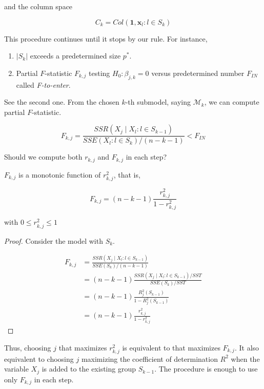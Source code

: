\documentclass[]{book}
\providecommand{\tightlist}{%
  \setlength{\itemsep}{0pt}\setlength{\parskip}{0pt}}
\theoremstyle{definition}
\theoremstyle{definition}
\theoremstyle{definition}
\theoremstyle{remark}
\let\BeginKnitrBlock\begin \let\EndKnitrBlock\end
\begin{document}
and the column space

\[C_k = Col(\mathbf{1}, \mathbf{x}_l : l \in S_k)\]

This procedure continues until it stops by our rule. For instance,

\begin{enumerate}
\def\labelenumi{\arabic{enumi}.}
\tightlist
\item
  \(\lvert S_k \rvert\) exceeds a predetermined size \(p^{\ast}\).
\item
  Partial \(F\)-statistic \(F_{k,j}\) testing \(H_0: \beta_{j,k} = 0\) versus predetermined number \(F_{IN}\) called \emph{F-to-enter}.
\end{enumerate}

See the second one. From the chosen \(k\)-th submodel, saying \(\mathcal{M}_k\), we can compute partial \(F\)-statistic.

\begin{equation}
  F_{k,j} = \frac{SSR(X_j \mid X_l : l \in S_{k - 1})}{SSE(X_l : l \in S_k) / (n - k - 1)} < F_{IN}
  \label{eq:fsstop}
\end{equation}

Should we compute both \(r_{k,j}\) and \(F_{k,j}\) in each step?

\BeginKnitrBlock{remark}
{}\(F_{k,j}\) is a monotonic function of \(r_{k,j}^2\), that is,

\[F_{k,j} = (n - k - 1) \frac{r_{k,j}^2}{1 - r_{k,j}^2}\]

with \(0 \le r_{k,j}^2 \le 1\)
\EndKnitrBlock{remark}

\BeginKnitrBlock{proof}
{}Consider the model with \(S_k\).

\begin{equation*}
  \begin{split}
   F_{k,j} & = \frac{SSR(X_j \mid X_l : l \in S_{k - 1})}{SSE(S_k) / (n - k - 1)} \\
   & = (n - k - 1) \frac{SSR(X_j \mid X_l : l \in S_{k - 1}) / SST}{SSE(S_k) / SST} \\
   & = (n - k - 1) \frac{R_j^2(S_{k - 1})}{1 - R_j^2(S_{k - 1})} \\
   & = (n - k - 1) \frac{r_{k, j}^2}{1 - r_{k,j}^2}
  \end{split}
\end{equation*}
\EndKnitrBlock{proof}

Thus, choosing \(j\) that maximizes \(r_{k,j}^2\) is equivalent to that maximizes \(F_{k,j}\). It also equivalent to choosing \(j\) maximizing the coefficient of determination \(R^2\) when the variable \(X_j\) is added to the existing group \(S_{k - 1}\). The procedure is enough to use only \(F_{k,j}\) in each step.
\end{document}
